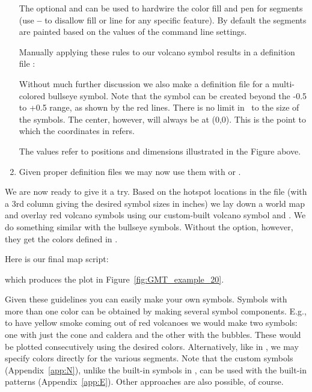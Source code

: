 \begin{enumerate}
The optional  and  can be used to hardwire
the color fill and pen for segments (use {\bf --} to disallow
fill or line for any specific feature).  By default the segments
are painted based on the values of the command line settings.

Manually applying these rules to our volcano symbol results in a
definition file :


Without much further discussion we also make a definition file  for a multi-colored bullseye symbol.
Note that the symbol can be created beyond the -0.5 to +0.5 range, as shown by the red lines. There is no limit in
\GMT\ to the size of the symbols. The center, however, will always be at (0,0). This is the point to which the
coordinates in  refers.


The values refer to positions and dimensions illustrated in the Figure above.

\item Given proper definition files we may now use them with  or .
\end{enumerate}

We are now ready to give it a try.  Based on the hotspot
locations in the file  (with a 3rd column
giving the desired symbol sizes in inches) we lay down a
world map and overlay red volcano symbols using our custom-built
volcano symbol and . We do something similar with the bullseye symbols.
Without the  option, however, they get the colors defined in .

Here is our final map script:


which produces the plot in Figure~\ref{fig:GMT_example_20}.


Given these guidelines you can easily make your own symbols.
Symbols with more than one color can be obtained by making
several symbol components.  E.g., to have yellow smoke coming
out of red volcanoes we would make two symbols: one with just
the cone and caldera and the other with the bubbles.  These
would be plotted consecutively using the desired colors.
Alternatively, like in , we may
specify colors directly for the various segments.  Note that
the custom symbols (Appendix~\ref{app:N}), unlike the built-in symbols in \GMT, can
be used with the built-in patterns (Appendix~\ref{app:E}).  Other
approaches are also possible, of course.

